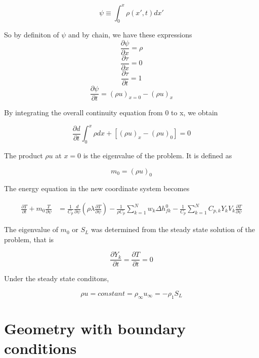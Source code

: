 $$\psi \equiv \int_{0}^{x} \rho(x',t)dx'$$

\noindent So by definiton of $\psi$ and by chain, we have these expressions
 $$\frac{\partial \psi}{\partial x} = \rho$$
 $$\frac{\partial \tau}{\partial x} = 0$$
 $$\frac{\partial \tau}{\partial t} = 1$$
 $$\frac{\partial \psi}{\partial t} = (\rho u)_{x=0} - (\rho u)_{x} $$

\noindent By integrating the overall continuity equation from 0 to x, we obtain 

$$\frac{\partial d}{\partial t} \int_{0}^{x} \rho dx + [(\rho u)_{x} - (\rho u)_{0} ] = 0$$ 

\noindent The product $\rho u$ at $x =0$ is the eigenvalue of the problem. It is defined as 

$$m_0 = (\rho u)_0$$

\noindent The energy equation in the new coordinate system becomes 

\begin{eqnarray}
 \frac{\partial T}{\partial t} + m_0 \frac{T}{\partial \psi} &= \frac{1}{C_p}\frac{d}{\partial \psi} \left(\rho \lambda \frac{\partial T}{\partial \psi}\right)  - \frac{1}{\rho C_p} \sum_{k=1}^{N} w_k \Delta h^0_{fk} - \frac{1}{C_p}  \sum_{k=1}^{N} C_{p,k} Y_k V_k \frac{\partial T}{\partial \psi}
\end{eqnarray}

\noindent The eigenvalue of $m_0$ or $S_L$ was determined from the steady state solution of the problem, that is 

$$\frac{\partial Y_k}{\partial t} = \frac{\partial T}{\partial t} = 0$$

\noindent Under the steady state conditons,

$$\rho u = constant = \rho_\infty u_\infty = -\rho_1 S_L$$
 
 
 \section{Geometry with boundary conditions}

